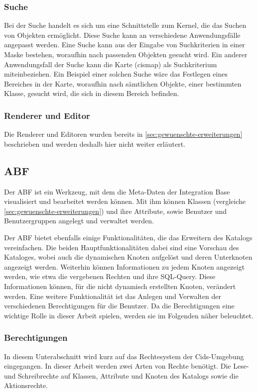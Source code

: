 \subsubsection{Suche}
Bei der Suche handelt es sich um eine Schnittstelle zum Kernel, die das Suchen von Objekten ermöglicht.
Diese Suche kann an verschiedene Anwendungsfälle angepasst werden.
Eine Suche kann aus der Eingabe von Suchkriterien in einer Maske bestehen, woraufhin nach passenden Objekten gesucht wird.
Ein anderer Anwendungsfall der Suche kann die Karte (cismap) als Suchkriterium miteinbeziehen.
Ein Beispiel einer solchen Suche wäre das Festlegen eines Bereiches in der Karte, woraufhin nach sämtlichen Objekte, einer bestimmten Klasse, gesucht wird, die sich in diesem Bereich befinden.

\subsubsection{Renderer und Editor}
Die Renderer und Editoren wurden bereits in \autoref{sec:gewuenschte-erweiterungen} beschrieben und werden deshalb hier nicht weiter erläutert.

\subsection{ABF}
Der \ac{ABF} ist ein Werkzeug, mit dem die Meta-Daten der Integration Base visualisiert und bearbeitet werden können.
Mit ihm können Klassen (vergleiche \autoref{sec:gewuenschte-erweiterungen}) und ihre Attribute, sowie Benutzer und Benutzergruppen angelegt und verwaltet werden.

Der \ac{ABF} bietet ebenfalls einige Funktionalitäten, die das Erweitern des Katalogs vereinfachen.
Die beiden Hauptfunktionalitäten dabei sind eine Vorschau des Kataloges, wobei auch die dynamischen Knoten aufgelöst und deren Unterknoten angezeigt werden.
Weiterhin können Informationen zu jedem Knoten angezeigt werden, wie etwa die vergebenen Rechten und ihre SQL-Query.
Diese Informationen können, für die nicht dynamisch erstellten Knoten, verändert werden.
Eine weitere Funktionalität ist das Anlegen und Verwalten der verschiedenen Berechtigungen für die Benutzer.
Da die Berechtigungen eine wichtige Rolle in dieser Arbeit spielen, werden sie im Folgenden näher beleuchtet. 

\subsubsection{Berechtigungen}
In diesem Unterabschnitt wird kurz auf das Rechtesystem der Cids-Umgebung eingegangen. In dieser Arbeit werden zwei Arten von Rechte benötigt. Die Lese- und Schreibrechte auf Klassen, Attribute und Knoten des Katalogs sowie die Aktionsrechte.


